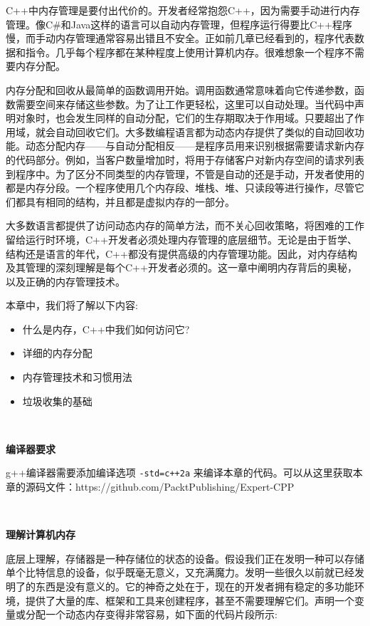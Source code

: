 C++中内存管理是要付出代价的。开发者经常抱怨C++，因为需要手动进行内存管理。像C\#和Java这样的语言可以自动内存管理，但程序运行得要比C++程序慢，而手动内存管理通常容易出错且不安全。正如前几章已经看到的，程序代表数据和指令。几乎每个程序都在某种程度上使用计算机内存。很难想象一个程序不需要内存分配。 \par
内存分配和回收从最简单的函数调用开始。调用函数通常意味着向它传递参数，函数需要空间来存储这些参数。为了让工作更轻松，这里可以自动处理。当代码中声明对象时，也会发生同样的自动分配，它们的生存期取决于作用域。只要超出了作用域，就会自动回收它们。大多数编程语言都为动态内存提供了类似的自动回收功能。动态分配内存——与自动分配相反——是程序员用来识别根据需要请求新内存的代码部分。例如，当客户数量增加时，将用于存储客户对新内存空间的请求列表到程序中。为了区分不同类型的内存管理，不管是自动的还是手动，开发者使用的都是内存分段。一个程序使用几个内存段、堆栈、堆、只读段等进行操作，尽管它们都具有相同的结构，并且都是虚拟内存的一部分。 \par
大多数语言都提供了访问动态内存的简单方法，而不关心回收策略，将困难的工作留给运行时环境，C++开发者必须处理内存管理的底层细节。无论是由于哲学、结构还是语言的年代，C++都没有提供高级的内存管理功能。因此，对内存结构及其管理的深刻理解是每个C++开发者必须的。这一章中阐明内存背后的奥秘，以及正确的内存管理技术。 \par
本章中，我们将了解以下内容: \par

\begin{itemize}
	\item 什么是内存，C++中我们如何访问它?
	\item 详细的内存分配
	\item 内存管理技术和习惯用法
	\item 垃圾收集的基础
\end{itemize}

\noindent\textbf{}\ \par
\textbf{编译器要求} \ \par
g++编译器需要添加编译选项 \texttt{-std=c++2a} 来编译本章的代码。可以从这里获取本章的源码文件：https:/​/github.​com/PacktPublishing/Expert-CPP \par

\noindent\textbf{}\ \par
\textbf{理解计算机内存} \ \par
底层上理解，存储器是一种存储位的状态的设备。假设我们正在发明一种可以存储单个比特信息的设备，似乎既毫无意义，又充满魔力。发明一些很久以前就已经发明了的东西是没有意义的。它的神奇之处在于，现在的开发者拥有稳定的多功能环境，提供了大量的库、框架和工具来创建程序，甚至不需要理解它们。声明一个变量或分配一个动态内存变得非常容易，如下面的代码片段所示: \par

